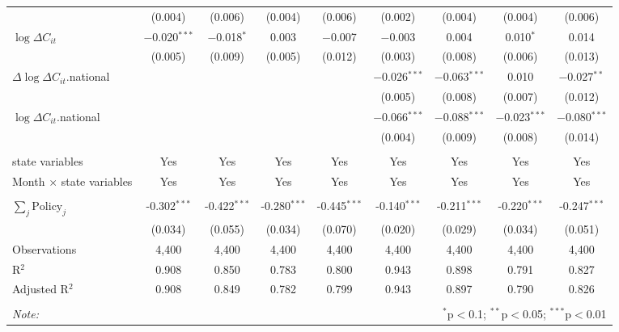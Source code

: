 \begin{tabular}{@{\extracolsep{1pt}}lcccccccc}
  & (0.004) & (0.006) & (0.004) & (0.006) & (0.002) & (0.004) & (0.004) & (0.006) \\ 
  $\log \Delta C_{it}$ & $-$0.020$^{***}$ & $-$0.018$^{*}$ & 0.003 & $-$0.007 & $-$0.003 & 0.004 & 0.010$^{*}$ & 0.014 \\ 
  & (0.005) & (0.009) & (0.005) & (0.012) & (0.003) & (0.008) & (0.006) & (0.013) \\ 
  $\Delta \log \Delta C_{it}$.national &  &  &  &  & $-$0.026$^{***}$ & $-$0.063$^{***}$ & 0.010 & $-$0.027$^{**}$ \\ 
  &  &  &  &  & (0.005) & (0.008) & (0.007) & (0.012) \\ 
  $\log \Delta C_{it}$.national &  &  &  &  & $-$0.066$^{***}$ & $-$0.088$^{***}$ & $-$0.023$^{***}$ & $-$0.080$^{***}$ \\ 
  &  &  &  &  & (0.004) & (0.009) & (0.008) & (0.014) \\ 
 \hline \\[-1.8ex] 
state variables & Yes & Yes & Yes & Yes & Yes & Yes & Yes & Yes \\ 
Month $\times$ state variables & Yes & Yes & Yes & Yes & Yes & Yes & Yes & Yes \\ 
\hline \\[-1.8ex] 
$\sum_j \mathrm{Policy}_j$ & -0.302$^{***}$ & -0.422$^{***}$ & -0.280$^{***}$ & -0.445$^{***}$ & -0.140$^{***}$ & -0.211$^{***}$ & -0.220$^{***}$ & -0.247$^{***}$ \\ 
 & (0.034) & (0.055) & (0.034) & (0.070) & (0.020) & (0.029) & (0.034) & (0.051) \\ 
Observations & 4,400 & 4,400 & 4,400 & 4,400 & 4,400 & 4,400 & 4,400 & 4,400 \\ 
R$^{2}$ & 0.908 & 0.850 & 0.783 & 0.800 & 0.943 & 0.898 & 0.791 & 0.827 \\ 
Adjusted R$^{2}$ & 0.908 & 0.849 & 0.782 & 0.799 & 0.943 & 0.897 & 0.790 & 0.826 \\ 
\hline 
\hline \\[-1.8ex] 
\textit{Note:}  & \multicolumn{8}{r}{$^{*}$p$<$0.1; $^{**}$p$<$0.05; $^{***}$p$<$0.01} \\ 
\end{tabular} 